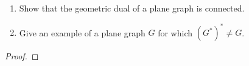 \prob
{
    \begin{enumerate}[label=(\roman*)]
        \item Show that the geometric dual of a plane graph is connected.
        \item Give an example of a plane graph $G$ for which $(G^*)^* \not= G$.
    \end{enumerate}
}
\begin{proof}
\end{proof}